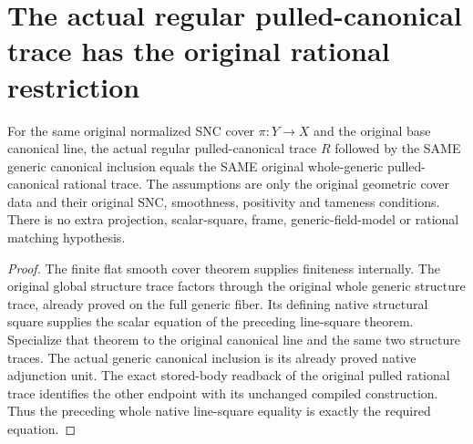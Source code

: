 \section{The actual regular pulled-canonical trace has the original rational restriction}

\begin{theorem}
\label{thm:kn-original-regular-pulled-canonical-rational-restriction}
\leanok
For the same original normalized SNC cover $\pi:Y\to X$ and the
original base canonical line, the actual regular pulled-canonical trace
$R$ followed by the SAME generic canonical inclusion equals the SAME
original whole-generic pulled-canonical rational trace. The assumptions
are only the original geometric cover data and their original SNC,
smoothness, positivity and tameness conditions. There is no extra
projection, scalar-square, frame, generic-field-model or rational
matching hypothesis.
\end{theorem}
\begin{proof}
The finite flat smooth cover theorem supplies finiteness internally.
The original global structure trace factors through the original whole
generic structure trace, already proved on the full generic fiber.
Its defining native structural square supplies the scalar equation of
the preceding line-square theorem. Specialize that theorem to the
original canonical line and the same two structure traces. The actual
generic canonical inclusion is its already proved native adjunction
unit. The exact stored-body readback of the original pulled rational
trace identifies the other endpoint with its unchanged compiled
construction. Thus the preceding whole native line-square equality is
exactly the required equation.
\end{proof}
